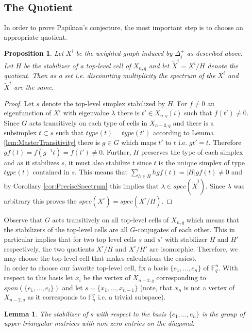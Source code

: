 \documentclass[11pt]{amsart}
\newtheorem{proposition}[theorem]{Proposition}
\newtheorem{lemma}[theorem]{Lemma}
\begin{document}
    \subsection{The Quotient}
    \label{sec:TheQuotient}
    In order to prove Papikian's conjecture, the most important step is to choose an appropriate quotient.
    \begin{proposition}
        Let $X^i$ be the weighted graph induced by $\Delta_i^+$ as described above. Let $H$ be the stabilizer of a top-level cell of $X_{n,q}$ and let $\tilde{X}^i=X^i/H$ denote the quotient. Then as a set i.e. discounting multiplicity the spectrum of the $X^i$ and $\tilde{X}^i$ are the same. 
        \label{prop:SpectralEquivalence}
    \end{proposition}
    \begin{proof}
        Let $s$ denote the top-level simplex stabilized by $H$. For $f\neq 0$ an eigenfunction of $X^i$ with eigenvalue $\lambda$ there is $t'\in X_{n,q}(i)$ such that $f(t')\neq 0$. Since $G$ acts transitively on each type of cells in $X_{n-2,q}$ and there is a subsimplex $t\subset s$ such that $type(t)=type(t')$ according to Lemma \ref{lem:MasterTransitivity} there is $g\in G$ which maps $t'$ to $t$ i.e. $gt'=t$. Therefore $gf(t)=f(g^{-1}t)=f(t')\neq 0$. Further, $H$ preserves the type of each simplex and as it stabilizes $s$, it must also stabilize $t$ since $t$ is the unique simplex of type $type(t)$ contained in $s$. This means that $\sum_{h\in H}hgf(t)=|H|gf(t)\neq 0$ and by Corollary \ref{cor:PreciseSpectrum} this implies that $\lambda \in spec(\tilde{X}^i)$. Since $\lambda$ was arbitrary this proves the $spec(X^i)=spec(X^i/H)$. 
    \end{proof}
    Observe that $G$ acts transitively on all top-level cells of $X_{n,q}$ which means that the stabilizers of the top-level cells are all $G$-conjugates of each other. This in particular implies that for two top level cells $s$ and $s'$ with stabilizer $H$ and $H'$ respectively, the two quotients $X^i/H$ and $X^i/H'$ are isomorphic. Therefore, we may choose the top-level cell that makes calculations the easiest.\\
    In order to choose our favorite top-level cell, fix a basis $\{e_1,\dots, e_n\}$ of $\mathbb{F}_q^n$. With respect to this basis let $x_i$ be the vertex of $X_{n-2,q}$ corresponding to $span(\{e_1,\dots, e_i\})$ and let $s=\{x_1,\dots,x_{n-1}\}$ (note, that $x_n$ is not a vertex of $X_{n-2,q}$ as it corresponds to $\mathbb{F}_n^q$ i.e. a trivial subspace). 
    \begin{lemma}
        The stabilizer of $s$ with respect to the basis $\{e_1,\dots, e_n\}$ is the group of upper triangular matrices with non-zero entries on the diagonal. 
    \end{lemma}
\end{document}
